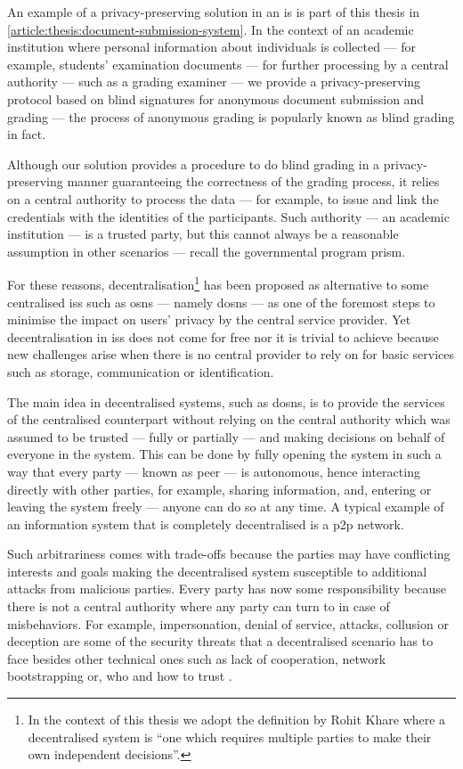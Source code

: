 An example of a privacy-preserving solution in an \ac{is} is part of 
this thesis in \cref{article:thesis:document-submission-system}. In the context of an academic 
institution where personal information about individuals is collected --- for example, 
students' examination documents --- for further processing by a central authority 
--- such as a grading examiner --- we provide a privacy-preserving protocol based 
on blind signatures for anonymous document submission and grading --- the process 
of anonymous grading is popularly known as blind grading in fact. 

Although our solution provides a procedure to do blind grading in a privacy-preserving 
manner guaranteeing the correctness of the grading process, it relies on a central 
authority to process the data --- for example, to issue and link the credentials with 
the identities of the participants. Such authority --- an academic institution --- 
is a trusted party, but this cannot always be a reasonable assumption in other scenarios 
--- recall the governmental program \ac{prism}.

For these reasons, decentralisation\footnote{In the context of this thesis we adopt 
the definition by Rohit Khare where a decentralised system is ``one which requires 
multiple parties to make their own independent decisions''.} has been proposed as 
alternative to some centralised \acp{is} such as \acp{osn} --- namely \acp{dosn} --- 
as one of the foremost steps to minimise the impact on users' privacy by the central 
service provider. Yet decentralisation in \acp{is} does not come for 
free nor it is trivial to achieve because new challenges arise when there is no 
central provider to rely on for basic services such as storage, communication or 
identification.

The main idea in decentralised systems, such as \acp{dosn}, is to provide the services 
of the centralised counterpart without relying on the central authority which was 
assumed to be trusted --- fully or partially --- and making decisions on behalf 
of everyone in the system. This can be done by fully opening the system in such 
a way that every party --- known as peer --- is autonomous, hence interacting directly 
with other parties, for example, sharing information, and, entering or leaving the 
system freely --- anyone can do so at any time. A typical example of an information 
system that is completely decentralised is a \ac{p2p} network.

Such arbitrariness comes with trade-offs because the parties may have conflicting 
interests and goals making the decentralised system susceptible to additional attacks 
from malicious parties. Every party has now some responsibility because there is 
not a central authority where any party can turn to in case of misbehaviors. For 
example, impersonation, denial of service, \Sybil attacks, collusion or deception 
are some of the security threats that a decentralised scenario has to face besides 
other technical ones such as lack of cooperation, network bootstrapping or, who and 
how to trust \cite{BucheggerA09}.

